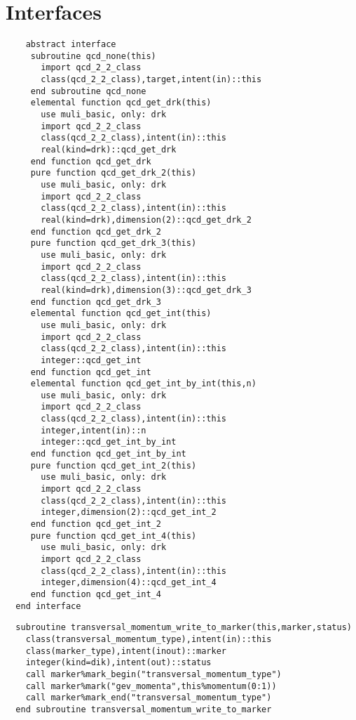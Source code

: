 \section{Interfaces}
\begin{Verbatim}
    abstract interface
     subroutine qcd_none(this)
       import qcd_2_2_class
       class(qcd_2_2_class),target,intent(in)::this
     end subroutine qcd_none
     elemental function qcd_get_drk(this)
       use muli_basic, only: drk
       import qcd_2_2_class
       class(qcd_2_2_class),intent(in)::this
       real(kind=drk)::qcd_get_drk
     end function qcd_get_drk
     pure function qcd_get_drk_2(this)
       use muli_basic, only: drk
       import qcd_2_2_class
       class(qcd_2_2_class),intent(in)::this
       real(kind=drk),dimension(2)::qcd_get_drk_2
     end function qcd_get_drk_2
     pure function qcd_get_drk_3(this)
       use muli_basic, only: drk
       import qcd_2_2_class
       class(qcd_2_2_class),intent(in)::this
       real(kind=drk),dimension(3)::qcd_get_drk_3
     end function qcd_get_drk_3
     elemental function qcd_get_int(this)
       use muli_basic, only: drk
       import qcd_2_2_class
       class(qcd_2_2_class),intent(in)::this
       integer::qcd_get_int
     end function qcd_get_int
     elemental function qcd_get_int_by_int(this,n)
       use muli_basic, only: drk
       import qcd_2_2_class
       class(qcd_2_2_class),intent(in)::this
       integer,intent(in)::n
       integer::qcd_get_int_by_int
     end function qcd_get_int_by_int
     pure function qcd_get_int_2(this)
       use muli_basic, only: drk
       import qcd_2_2_class
       class(qcd_2_2_class),intent(in)::this
       integer,dimension(2)::qcd_get_int_2
     end function qcd_get_int_2
     pure function qcd_get_int_4(this)
       use muli_basic, only: drk
       import qcd_2_2_class
       class(qcd_2_2_class),intent(in)::this
       integer,dimension(4)::qcd_get_int_4
     end function qcd_get_int_4
  end interface
\end{Verbatim}
\Methods
{}
\begin{Verbatim}
  subroutine transversal_momentum_write_to_marker(this,marker,status)
    class(transversal_momentum_type),intent(in)::this
    class(marker_type),intent(inout)::marker
    integer(kind=dik),intent(out)::status
    call marker%mark_begin("transversal_momentum_type")
    call marker%mark("gev_momenta",this%momentum(0:1))
    call marker%mark_end("transversal_momentum_type")
  end subroutine transversal_momentum_write_to_marker
\end{Verbatim}
